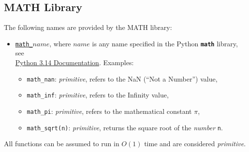 \subsection*{MATH Library}

The following names are provided by the MATH library:
\begin{itemize}
\item \href{https://sourceacademy.org/sicpy/1.1.4\#p8}{\lstinline{math_}$\textit{name}$},
where $\textit{name}$ is any name specified in the
Python
\texttt{\textbf{math}} library, see\\
\href{https://docs.python.org/3.14/library/math.html}{\color{DarkBlue}Python 3.14 Documentation}. Examples:
\begin{itemize}
\item \verb#math_nan#: \textit{primitive}, refers to the NaN (``Not a Number'') value,
\item \verb#math_inf#: \textit{primitive}, refers to the Infinity value,
\item \verb#math_pi#: \textit{primitive}, refers to the mathematical constant $\pi$,
\item \verb#math_sqrt#\texttt{(n)}: \textit{primitive}, returns the square root of the \emph{number} \texttt{n}.
\end{itemize}
\end{itemize}
All functions can be assumed to run in $O(1)$ time and are considered
\textit{primitive}.
